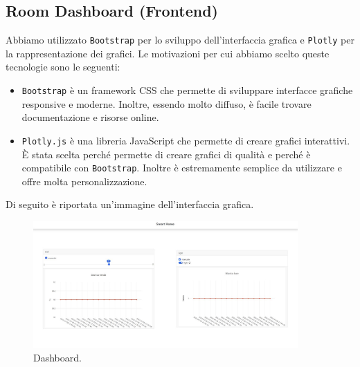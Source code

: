 \documentclass[a4paper,12pt]{report}
\begin{document}
\subsection{Room Dashboard (Frontend)}
Abbiamo utilizzato \texttt{Bootstrap} per lo sviluppo dell'interfaccia grafica e \texttt{Plotly}
per la rappresentazione dei grafici.
Le motivazioni per cui abbiamo scelto queste tecnologie sono le seguenti:
\begin{itemize}
    \item \texttt{Bootstrap} è un framework CSS che permette di sviluppare interfacce grafiche responsive e moderne. Inoltre, essendo molto diffuso, è facile trovare documentazione e risorse online.
    \item \texttt{Plotly.js} è una libreria JavaScript che permette di creare grafici interattivi. È stata scelta perché permette di creare grafici di qualità e perché è compatibile con \texttt{Bootstrap}. Inoltre è estremamente semplice da utilizzare e offre molta personalizzazione.
\end{itemize}
Di seguito è riportata un'immagine dell'interfaccia grafica.

\begin{figure}[H]
    \centering
    \includegraphics[width=0.9\textwidth]{img/Ui - dashboard.jpeg}
    \caption{Dashboard.}
    \label{fig:dashboard}
\end{figure}
\end{document}
